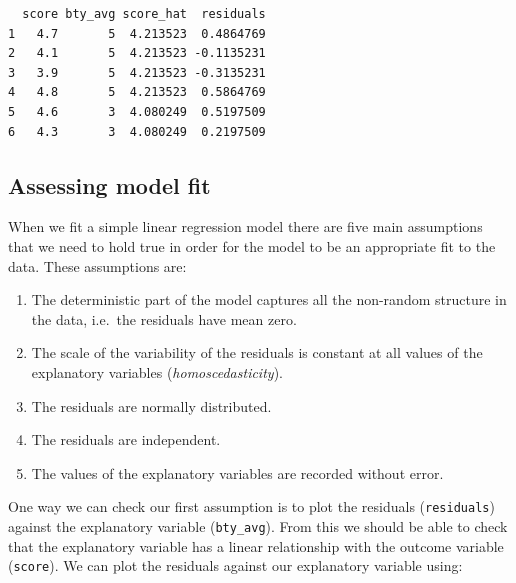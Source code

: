 \documentclass[
  letterpaper,
  DIV=11,
  numbers=noendperiod]{scrartcl}
\newenvironment{Shaded}{\begin{snugshade}}{\end{snugshade}}
\newcommand{\AttributeTok}[1]{\textcolor[rgb]{0.40,0.45,0.13}{#1}}
\newcommand{\DecValTok}[1]{\textcolor[rgb]{0.68,0.00,0.00}{#1}}
\newcommand{\FunctionTok}[1]{\textcolor[rgb]{0.28,0.35,0.67}{#1}}
\newcommand{\NormalTok}[1]{\textcolor[rgb]{0.00,0.23,0.31}{#1}}
\newcommand{\OtherTok}[1]{\textcolor[rgb]{0.00,0.23,0.31}{#1}}
\newcommand{\SpecialCharTok}[1]{\textcolor[rgb]{0.37,0.37,0.37}{#1}}
\providecommand{\tightlist}{%
  \setlength{\itemsep}{0pt}\setlength{\parskip}{0pt}}\usepackage{longtable,booktabs,array}
\begin{document}
\begin{Shaded}
\end{Shaded}

\begin{verbatim}
  score bty_avg score_hat  residuals
1   4.7       5  4.213523  0.4864769
2   4.1       5  4.213523 -0.1135231
3   3.9       5  4.213523 -0.3135231
4   4.8       5  4.213523  0.5864769
5   4.6       3  4.080249  0.5197509
6   4.3       3  4.080249  0.2197509
\end{verbatim}

\subsection{Assessing model fit}\label{assessing-model-fit}

When we fit a simple linear regression model there are five main
assumptions that we need to hold true in order for the model to be an
appropriate fit to the data. These assumptions are:

\begin{enumerate}
\def\labelenumi{\arabic{enumi}.}
\tightlist
\item
  The deterministic part of the model captures all the non-random
  structure in the data, i.e.~the residuals have mean zero.
\item
  The scale of the variability of the residuals is constant at all
  values of the explanatory variables (\emph{homoscedasticity}).
\item
  The residuals are normally distributed.
\item
  The residuals are independent.
\item
  The values of the explanatory variables are recorded without error.
\end{enumerate}

One way we can check our first assumption is to plot the residuals
(\texttt{residuals}) against the explanatory variable
(\texttt{bty\_avg}). From this we should be able to check that the
explanatory variable has a linear relationship with the outcome variable
(\texttt{score}). We can plot the residuals against our explanatory
variable using:
\end{document}
